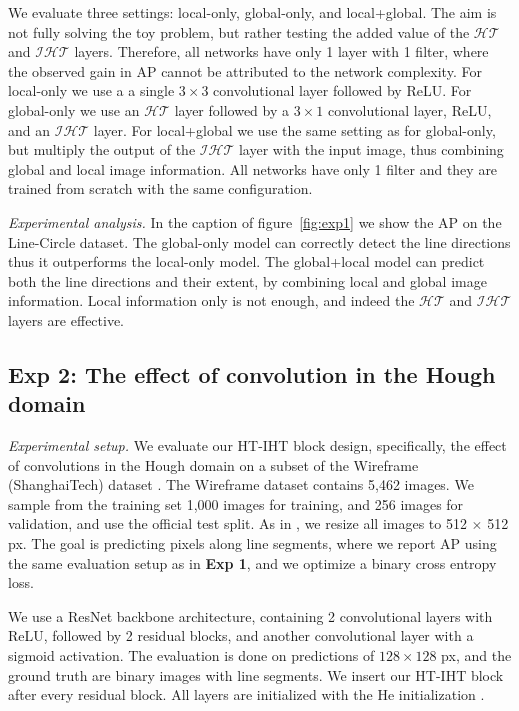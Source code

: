 \documentclass[runningheads]{llncs}
\newcommand{\model}{HT-IHT block\xspace}
\begin{document}
We evaluate three settings: local-only, global-only, and local+global. 
The aim is not fully solving the toy problem, but rather testing the added value of the $\mathcal{HT}$ and $\mathcal{IHT}$ layers. Therefore, all networks have only 1  layer with 1 filter, where the observed gain in AP cannot be attributed to the network complexity. 
For local-only we use a a single $3\times 3$ convolutional layer followed by ReLU. For global-only we use an $\mathcal{HT}$ layer followed by a $3\times 1$ convolutional layer, ReLU, and an $\mathcal{IHT}$ layer. For local+global we use the same setting as for global-only, but multiply the output of the $\mathcal{IHT}$ layer with the input image, thus combining global and local image information.
All networks have only 1 filter and they are trained from scratch with the same configuration.

\noindent\emph{Experimental analysis.} 
In the caption of figure~\ref{fig:exp1} we show the AP on the Line-Circle dataset.
The global-only model can correctly detect the line directions thus it outperforms the local-only model.
The global+local model can predict both the line directions and their extent, by combining local and global image information. Local information only is not enough, and indeed the $\mathcal{HT}$ and $\mathcal{IHT}$ layers are effective.

\subsection{\textbf{Exp 2:} The effect of convolution in the Hough domain}
\label{exp2}
\noindent\emph{Experimental setup.}
We evaluate our \model design, specifically, the effect of convolutions in the Hough domain on a subset of the Wireframe (ShanghaiTech) dataset \cite{huang2018learning}.
The Wireframe dataset contains 5,462 images. We sample from the training set 1,000 images for training, and 256 images for validation, and use the official test split.
As in \cite{zhou2019learning}, we resize all images to 512 $\times$ 512 px.
The goal is predicting pixels along line segments, where we report AP using the same evaluation setup as in \textbf{Exp 1}, and we optimize a binary cross entropy loss.

We use a ResNet \cite{he2016deep} backbone architecture, containing 2 convolutional layers with ReLU, followed by 2 residual blocks, and another convolutional layer with a sigmoid activation. The evaluation is done on predictions of $128\times 128$ px, and the ground truth are binary images with line segments.
We insert our \model after every residual block. 
All layers are initialized with the He initialization \cite{he2015delving}. 
\end{document}
